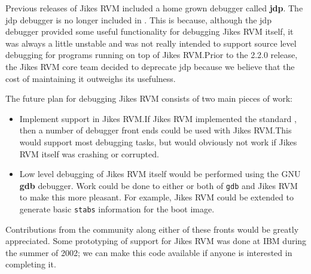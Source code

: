 Previous releases of Jikes\TMweb{} RVM included a home grown
debugger called {\bf jdp}.  The jdp debugger is no longer included in
\jrvm{}.  This is because, although the jdp debugger provided some
useful functionality for debugging Jikes RVM itself, it was always a
little unstable and was not really intended to support source level
debugging for programs running on top of Jikes RVM.\@  Prior to the
2.2.0 release, the Jikes RVM core team decided to deprecate jdp
because we believe that the cost of maintaining it outweighs its
usefulness.


The future plan for debugging Jikes RVM consists of two main pieces of
work:

\label{JDWP}
\begin{itemize}
\item Implement  support in Jikes RVM.\@ If Jikes RVM
implemented the standard , then a 
number of debugger front ends could be used with Jikes RVM.\@  This
would support most debugging tasks, but would obviously not work if
Jikes RVM itself was crashing or corrupted.

\item Low level debugging of Jikes RVM itself would be performed using
the GNU {\bf gdb} debugger.  Work could be done to either or both of
{\tt gdb} and Jikes RVM to make this more pleasant.  For example,
Jikes RVM could be extended to generate basic {\tt stabs} information
for the boot image.
\end{itemize}

Contributions from the community along either of these fronts would be
greatly appreciated.  Some prototyping of  support for Jikes RVM
was done at IBM during the summer of 2002; we can make this code
available if anyone is interested in completing it.


